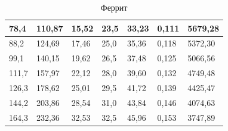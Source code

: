 \documentclass[a4paper,12pt]{article} %
\begin{document}
\begin{table}[h!]
\begin{tabular}{|l|l|l|l|l|l|l|}
		78,4                                      & 110,87                                                  & 15,52                                                 & 23,5                                     & 33,23                                                   & 0,111                        & 5679,28                                         \\ \hline
		88,2                                     & 124,69                                                  & 17,46                                                 & 25,0                                     & 35,36                                                   & 0,118                        & 5372,30                                         \\ \hline
		99,1                                      & 140,15                                                  & 19,62                                                 & 26,5                                     & 37,48                                                   & 0,125                        & 5066,56                                         \\ \hline
		111,7                                     & 157,97                                                  & 22,12                                                 & 28,0                                     & 39,60                                                    & 0,132                        & 4749,48                                         \\ \hline
		126,3                                     & 178,62                                                  & 25,01                                                 & 29,5                                     & 41,72                                                   & 0,139                        & 4425,47                                         \\ \hline
		144,2                                     & 203,86                                                  & 28,54                                                 & 31,0                                     & 43,84                                                   & 0,146                        & 4074,63                                         \\ \hline
		164,3                                     & 232,36                                                  & 32,53                                                 & 32,5                                     & 45,96                                                   & 0,153                        & 3747,89                                         \\ \hline
	\end{tabular}
	\caption{Феррит}
\end{table}
\end{document}
